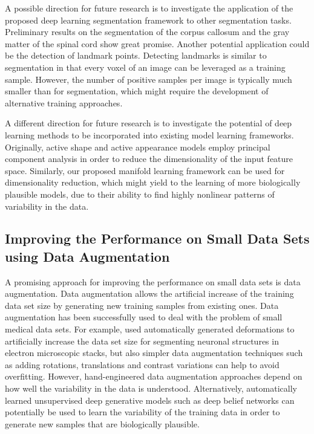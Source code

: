 A possible direction for future research is to investigate the application of
the proposed deep learning segmentation framework to other segmentation tasks.
Preliminary results on the segmentation of the corpus callosum and the gray
matter of the spinal cord show great promise. Another potential application
could be the detection of landmark points. Detecting landmarks is similar to
segmentation in that every voxel of an image can be leveraged as a training
sample. However, the number of positive samples per image is typically much
smaller than for segmentation, which might require the development of
alternative training approaches.


A different direction for future research is to investigate the potential of
deep learning methods to be incorporated into existing model learning
frameworks. Originally, active shape \citep{cootes1995} and active appearance
\citep{cootes2001} models employ principal component analysis in order to reduce
the dimensionality of the input feature space. Similarly, our proposed manifold
learning framework can be used for dimensionality reduction, which might yield
to the learning of more biologically plausible models, due to their ability to
find highly nonlinear patterns of variability in the data.

\subsection[Improving the performance on small data sets using data
augmentation]{Improving the Performance on Small Data Sets using Data
Augmentation}

A promising approach for improving the performance on small data sets is data
augmentation. Data augmentation allows the artificial increase of the training
data set size by generating new training samples from existing ones. Data
augmentation has been successfully used to deal with the problem of small
medical data sets. For example, \citet{ronneberger2015} used automatically
generated deformations to artificially increase the data set size for segmenting
neuronal structures in electron microscopic stacks, but also simpler data
augmentation techniques such as adding rotations, translations and contrast
variations can help to avoid overfitting. However, hand-engineered data
augmentation approaches depend on how well the variability in the data is
understood. Alternatively, automatically learned unsupervised deep generative
models such as deep belief networks can potentially be used to learn the
variability of the training data in order to generate new samples that are
biologically plausible.

